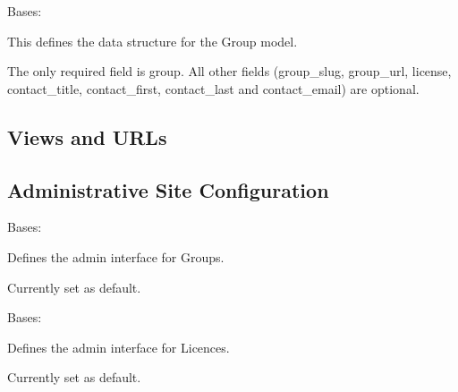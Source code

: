 \documentclass[letterpaper,10pt,english]{sphinxmanual}
\begin{document}
\begin{fulllineitems}
\label{api:groups.models.Group}
Bases: 

This defines the data structure for the Group model.

The only required field is group.
All other fields (group\_slug, group\_url, license, contact\_title, contact\_first, contact\_last and contact\_email) are optional.

\end{fulllineitems}



\subsection{Views and URLs}
\label{api:id10}\label{api:module-groups.views}

\subsection{Administrative Site Configuration}
\label{api:id11}\label{api:module-groups.admin}

\begin{fulllineitems}
\label{api:groups.admin.GroupAdmin}
Bases: 

Defines the admin interface for Groups.

Currently set as default.

\begin{fulllineitems}
\label{api:groups.admin.GroupAdmin.media}
\end{fulllineitems}


\end{fulllineitems}


\begin{fulllineitems}
\label{api:groups.admin.LicenseAdmin}
Bases: 

Defines the admin interface for Licences.

Currently set as default.

\begin{fulllineitems}
\label{api:groups.admin.LicenseAdmin.media}
\end{fulllineitems}


\end{fulllineitems}
\end{document}
